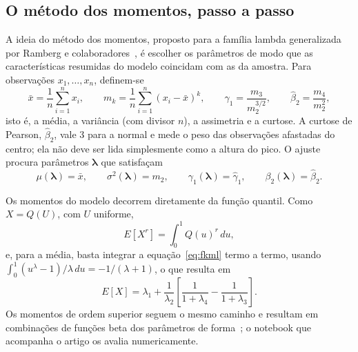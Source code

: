 \subsection{O método dos momentos, passo a passo}

A ideia do método dos momentos, proposto para a família lambda generalizada por Ramberg e colaboradores~\cite{ramberg1979}, é escolher os parâmetros de modo que as características resumidas do modelo coincidam com as da amostra. Para observações $x_1, \ldots, x_n$, definem-se
\begin{equation}
    \bar x = \frac{1}{n}\sum_{i=1}^{n} x_i, \qquad
    m_k = \frac{1}{n}\sum_{i=1}^{n} (x_i - \bar x)^k, \qquad
    \widehat\gamma_1 = \frac{m_3}{m_2^{3/2}}, \qquad
    \widehat\beta_2 = \frac{m_4}{m_2^{2}},
    \label{eq:momentos_amostra}
\end{equation}
isto é, a média, a variância (com divisor $n$), a assimetria e a curtose. A curtose de Pearson, $\widehat\beta_2$, vale $3$ para a normal e mede o peso das observações afastadas do centro; ela não deve ser lida simplesmente como a altura do pico. O ajuste procura parâmetros $\boldsymbol\lambda$ que satisfaçam
\begin{equation}
    \mu(\boldsymbol\lambda) = \bar x, \qquad
    \sigma^2(\boldsymbol\lambda) = m_2, \qquad
    \gamma_1(\boldsymbol\lambda) = \widehat\gamma_1, \qquad
    \beta_2(\boldsymbol\lambda) = \widehat\beta_2.
    \label{eq:sistema}
\end{equation}

Os momentos do modelo decorrem diretamente da função quantil. Como $X = Q(U)$, com $U$ uniforme,
\begin{equation}
    E[X^r] = \int_0^1 Q(u)^r \, du,
\end{equation}
e, para a média, basta integrar a equação~\eqref{eq:fkml} termo a termo, usando $\int_0^1 (u^{\lambda} - 1)/\lambda \, du = -1/(\lambda + 1)$, o que resulta em
\begin{equation}
    E[X] = \lambda_1 + \frac{1}{\lambda_2}
    \left[\frac{1}{1 + \lambda_4} - \frac{1}{1 + \lambda_3}\right].
    \label{eq:media}
\end{equation}
Os momentos de ordem superior seguem o mesmo caminho e resultam em combinações de funções beta dos parâmetros de forma~\cite{freimer1988,karian2011}; o notebook que acompanha o artigo os avalia numericamente.

